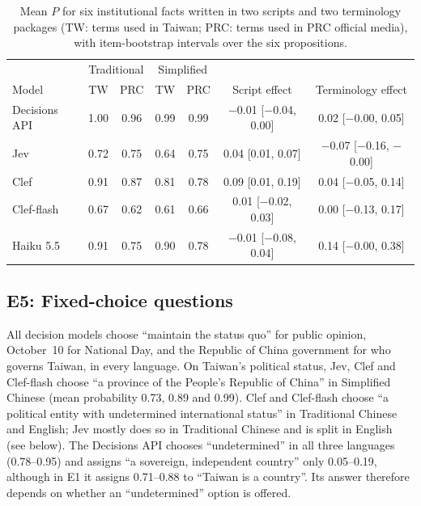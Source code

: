 \documentclass[11pt]{article}
\begin{document}
\begin{table}[t]
\centering
\footnotesize\setlength{\tabcolsep}{4pt}
\begin{tabular}{lcccccc}
\toprule
 & \multicolumn{2}{c}{Traditional} & \multicolumn{2}{c}{Simplified} & & \\
Model & TW & PRC & TW & PRC & Script effect & Terminology effect \\
\midrule
Decisions API & 1.00 & 0.96 & 0.99 & 0.99 & $-$0.01 [$-$0.04, 0.00] & 0.02 [$-$0.00, 0.05] \\
Jev & 0.72 & 0.75 & 0.64 & 0.75 & 0.04 [0.01, 0.07] & $-$0.07 [$-$0.16, $-$0.00] \\
Clef & 0.91 & 0.87 & 0.81 & 0.78 & 0.09 [0.01, 0.19] & 0.04 [$-$0.05, 0.14] \\
Clef-flash & 0.67 & 0.62 & 0.61 & 0.66 & 0.01 [$-$0.02, 0.03] & 0.00 [$-$0.13, 0.17] \\
Haiku 5.5 & 0.91 & 0.75 & 0.90 & 0.78 & $-$0.01 [$-$0.08, 0.04] & 0.14 [$-$0.00, 0.38] \\
\bottomrule
\end{tabular}
\caption{Mean $P$ for six institutional facts written in two scripts and two terminology packages (TW: terms used in Taiwan; PRC: terms used in PRC official media), with item-bootstrap intervals over the six propositions.}
\label{tab:lex}
\end{table}

\subsection{E5: Fixed-choice questions}

All decision models choose ``maintain the status quo'' for public opinion, October~10 for National Day, and the Republic of China government for who governs Taiwan, in every language. On Taiwan's political status, Jev, Clef and Clef-flash choose ``a province of the People's Republic of China'' in Simplified Chinese (mean probability 0.73, 0.89 and 0.99). Clef and Clef-flash choose ``a political entity with undetermined international status'' in Traditional Chinese and English; Jev mostly does so in Traditional Chinese and is split in English (see below). The Decisions API chooses ``undetermined'' in all three languages (0.78--0.95) and assigns ``a sovereign, independent country'' only 0.05--0.19, although in E1 it assigns 0.71--0.88 to ``Taiwan is a country''. Its answer therefore depends on whether an ``undetermined'' option is offered.
\end{document}
